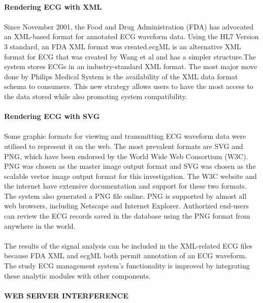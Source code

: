 \documentclass[12pt]{article}
\begin{document}
\paragraph{\textbf{Rendering ECG with XML}}
\paragraph{}Since November 2001, the Food and Drug Administration (FDA) has advocated an XML-based format for annotated ECG waveform data. Using the HL7 Version 3 standard, an FDA XML format was created.ecgML is an alternative XML format for ECG that was created by Wang et al and has a simpler structure.The system stores ECGs in an industry-standard XML format. The most major move done by Philips Medical System is the availability of the XML data format schema to consumers. This new strategy allows users to have the most access to the data stored while also promoting system compatibility.
\paragraph{\textbf{Rendering ECG with SVG}}
\paragraph{}Some graphic formats for viewing and transmitting ECG waveform data were utilised to represent it on the web. The most prevalent formats are SVG and PNG, which have been endorsed by the World Wide Web Consortium (W3C). PNG was chosen as the master image output format and SVG was chosen as the scalable vector image output format for this investigation. The W3C website and the internet have extensive documentation and support for these two formats.\\The system also generated a PNG file online. PNG is supported by almost all web browsers, including Netscape and Internet Explorer. Authorized end-users can review the ECG records saved in the database using the PNG format from anywhere in the world.
\paragraph{}The results of the signal analysis can be included in the XML-related ECG files because FDA XML and ecgML both permit annotation of an ECG waveform. The study ECG management system's functionality is improved by integrating these analytic modules with other components.
\paragraph{\textbf{WEB SERVER INTERFERENCE}}
\end{document}
